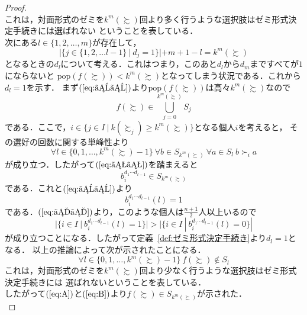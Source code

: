 \documentclass[dvipdfmx]{jsarticle}
\begin{document}
\begin{proof}
\begin{equation}
  \end{equation}
  これは，対面形式のゼミを$k^m(\succsim)$回より多く行うような選択肢はゼミ形式決定手続きには選ばれない
  ということを表している．\\
  次にある$l \in \{1,2,\ldots,m\}$が存在して，
  \begin{equation}\label{eq:ええ}
    |\{ j \in \{1,2,\ldots l-1\} \ | \ d_j=1 \}| + m + 1 - l = k^m(\succsim)
  \end{equation}
  となるときの$d_l$について考える．これはつまり，このあと$d_l$から$d_m$まですべてが$1$にならないと
  $\mathrm{pop}(f(\succsim)) < k^m(\succsim)$となってしまう状況である．これから$d_l=1$を示す．
  まず$(\ref{eq:ええ})$より$\mathrm{pop}(f(\succsim))$は高々$k^m(\succsim)$なので
  \begin{equation}\label{eq:おお}
    f(\succsim) \in \bigcup_{j=0}^{k^m(\succsim)}S_j
  \end{equation}
  である．ここで，$i \in \{j \in I \ | \ k(\succsim_j) \geq k^m(\succsim) \}$となる個人$i$を考えると，
  その選好の回数に関する単峰性より
  \begin{equation*}
    \forall l \in \{0,1,\ldots, k^m(\succsim)-1\}\ \forall b \in S_{k^m(\succsim)} \ 
    \forall a \in S_l \ b \succ_i a
  \end{equation*}
  が成り立つ．したがって$(\ref{eq:おお})$を踏まえると
  \begin{equation*}
    b_i^{d_{1}\cdots d_{l-1}} \in S_{k^m(\succsim)}
  \end{equation*}
  である．これと$(\ref{eq:ええ})$より
  \begin{equation*}
    b_i^{d_{1}\cdots d_{l-1}}(l) = 1
  \end{equation*}
  である．$(\ref{eq:いい})$より，このような個人は$\frac{n+1}{2}$人以上いるので
  \begin{equation*}
    |\{i \in I \ | \ b_{i}^{d_{1}\cdots d_{l-1}}(l) = 1 \}| >
    |\{i \in I \ | \ b_{i}^{d_{1}\cdots d_{l-1}}(l) = 0 \}|
  \end{equation*}
  が成り立つことになる．したがって定義~\ref{def:ゼミ形式決定手続き}より$d_l=1$となる．
  以上の推論によって次が示されたことになる．
  \begin{equation}\label{eq:B}
    \forall l \in \{0,1,\ldots, k^m(\succsim)-1\} \ f(\succsim) \notin S_l
  \end{equation}
  これは，対面形式のゼミを$k^m(\succsim)$回より少なく行うような選択肢はゼミ形式決定手続きには
  選ばれないということを表している．\\
  したがって$(\ref{eq:A})$と$(\ref{eq:B})$より$f(\succsim) \in S_{k^m(\succsim)}$が示された．\\

\end{proof}
\end{document}
